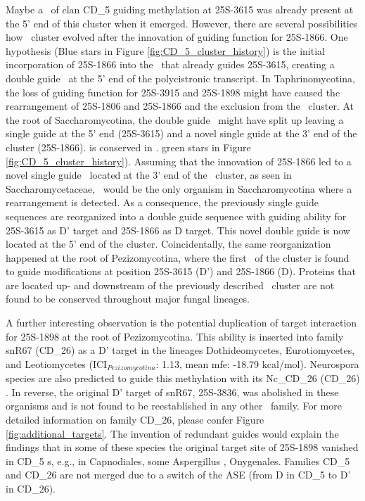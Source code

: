 Maybe a \sno\ of clan CD\_5 guiding methylation at 25S-3615 was already
present at the 5' end of this cluster when it emerged. However, there are
several possibilities how  \sno\ cluster evolved after the
innovation of guiding function for 25S-1866.  One hypothesis (Blue stars in
Figure \ref{fig:CD_5_cluster_history}) is the initial incorporation of
25S-1866 into the \sno\ that already guides 25S-3615, creating a double
guide \sno\ at the 5' end of the polycistronic transcript. In
Taphrinomycotina, the loss of guiding function for 25S-3915 and 25S-1898
might have caused the rearrangement of 25S-1806 and 25S-1866 and the
exclusion from the \sno\ cluster. At the root of Saccharomycotina, the
double guide \sno\ might have split up leaving a single guide at the 5' end
(25S-3615) and a novel single guide at the 3' end of the cluster
(25S-1866).  is conserved
 in \Yli.  green stars in
Figure \ref{fig:CD_5_cluster_history}). Assuming that the innovation of
25S-1866 led to a novel single guide \sno\ located at the 3' end of the
\sno\ cluster, as seen in Saccharomycetaceae, \yli\ would be the only
organism in Saccharomycotina where a rearrangement is detected. As a
consequence, the previously single guide sequences are reorganized into a
double guide sequence with guiding ability for 25S-3615 as D' target and
25S-1866 as D target. This novel double guide is now located at the 5' end
of the cluster.  Coincidentally, the same reorganization happened at the
root of Pezizomycotina, where the first \sno\ of the cluster is found to
guide modifications at position 25S-3615 (D') and 25S-1866 (D). Proteins
that are located up- and downstream of the previously described \sno\
cluster are not found to be conserved throughout major fungal lineages.

A further interesting observation is the potential duplication of target
interaction for 25S-1898 at the root of Pezizomycotina. This ability is
inserted into family snR67 (CD\_26) as a D' target in the lineages
Dothideomycetes, Eurotiomycetes, and Leotiomycetes (ICI$_{Pezizomycotina}$:
1.13, mean mfe: -18.79 kcal/mol). Neurospora species are also predicted to
guide this methylation with its Nc\_CD\_26 (CD\_26) \sno
\cite{Liu:2009}. In reverse, the original D' target of snR67, 25S-3836, was
abolished in these organisms and is not found to be reestablished in any
other \sno\ family. For more detailed information on family CD\_26, please
confer Figure \ref{fig:additional_targets}. The invention of redundant
guides would explain the findings that in some of these species the
original target site of 25S-1898 vanished in CD\_5 \sno s, e.g., in
Capnodiales, some Aspergillus \PFS{species}, \PFS{and} Onygenales. Families
CD\_5 and CD\_26 are not merged due to a switch of the ASE (from D in CD\_5
to D' in CD\_26).

